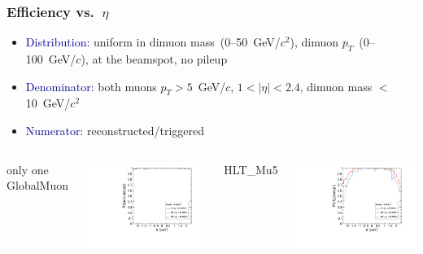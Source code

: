 \documentclass[compress]{beamer}
\begin{document}
\begin{frame}
\frametitle{Efficiency vs.\ $\eta$}
\begin{itemize}
\item \textcolor{darkblue}{Distribution:} uniform in dimuon mass~(0--50~GeV/$c^2$), dimuon $p_T$~(0--100~GeV/$c$), at the beamspot, no pileup

\item \textcolor{darkblue}{Denominator:} both muons $p_T > 5$~GeV/$c$, $1 < |\eta| < 2.4$, dimuon mass $<$ 10~GeV/$c^2$

\item \textcolor{darkblue}{Numerator:} reconstructed/triggered
\end{itemize}

\vfill
\begin{columns}
\centering only one GlobalMuon

\includegraphics[width=\linewidth]{eta_mass10cut_oneGlobalMuon.pdf}

\centering HLT\_Mu5

\includegraphics[width=\linewidth]{eta_mass10cut_Mu5.pdf}


\end{columns}
\end{frame}
\end{document}
